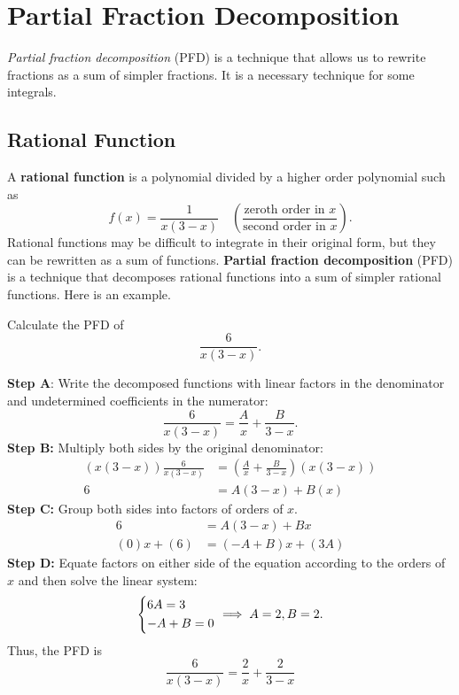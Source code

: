 \documentclass[09pt,letterpaper]{article}
\begin{document}
\section{Partial Fraction Decomposition}
\textit{Partial fraction decomposition} (PFD) is a technique that allows us to rewrite fractions as a sum of simpler fractions. It is a necessary technique for some integrals.

\subsection{Rational Function} 
A \textbf{rational function} is a polynomial divided by a higher order polynomial such as 
$$
f(x)=\frac{1}{x(3-x)} \quad \left(\frac{\text{zeroth order in } x}{\text{second order in }x}\right). 
$$
Rational functions may be difficult to integrate in their original form, but they can be rewritten as a sum of functions. \textbf{Partial fraction decomposition} (PFD) is a technique that decomposes rational functions into a sum of simpler rational functions. Here is an example.


\begin{example}[4]{

Calculate the PFD of 
$$
\frac{6}{x(3-x)}.
$$
}

\textbf{Step A}: Write the decomposed functions with linear factors in the denominator and undetermined coefficients in the numerator: 
$$
\frac{6}{x(3-x)} = \frac{A}{x} + \frac{B}{3-x}.
$$
\textbf{Step B:} Multiply both sides by the original denominator: 
\begin{align*}
    (x(3-x))\frac{6}{x(3-x)} &= \left(\frac{A}{x} + \frac{B}{3-x}\right) (x(3-x))\\
    6 &= A(3-x) + B(x)
\end{align*}
\textbf{Step C:} Group both sides into factors of orders of $x$.
\begin{align*}
    6 &= A(3-x) + Bx\\
    (0)x + (6) &=  (-A+B)x + (3A)
\end{align*}
\textbf{Step D:} Equate factors on either side of the equation according to the orders of $x$ and then solve the linear system:
$$
\begin{dcases}
    6A=3\\
    -A+B=0\\
\end{dcases} \implies  A=2, B=2.
$$
Thus, the PFD is 
$$
\boxed{
\frac{6}{x(3-x)} = \frac{2}{x} + \frac{2}{3-x}
}
$$
\end{example}
\end{document}

